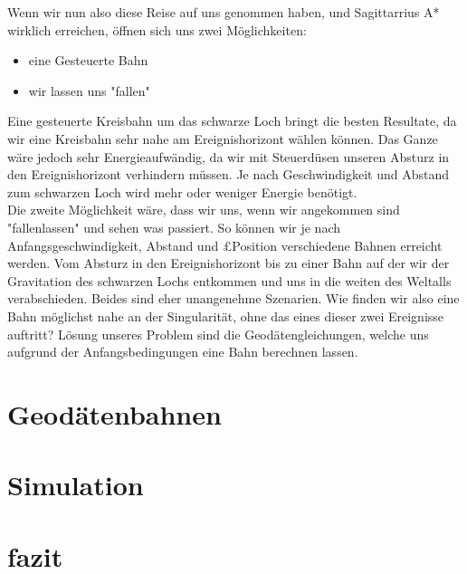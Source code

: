 \begin{refsection}
	Wenn wir nun also diese Reise auf uns genommen haben, und Sagittarrius A* wirklich erreichen, öffnen sich uns zwei Möglichkeiten:
	
	\begin{itemize}
		\item eine Gesteuerte Bahn
		\item wir lassen uns "fallen"
	\end{itemize}

	Eine gesteuerte Kreisbahn um das schwarze Loch bringt die besten Resultate, da wir eine Kreisbahn sehr nahe am Ereignishorizont wählen können. Das Ganze wäre jedoch sehr Energieaufwändig, da wir mit Steuerdüsen unseren Absturz in den Ereignishorizont verhindern müssen. Je nach Geschwindigkeit und Abstand zum schwarzen Loch wird mehr oder weniger Energie benötigt.\\
	Die zweite Möglichkeit wäre, dass wir uns, wenn wir angekommen sind "fallenlassen" und sehen was passiert. So können wir je nach Anfangsgeschwindigkeit, Abstand und £Position verschiedene Bahnen erreicht werden. Vom Absturz in den Ereignishorizont bis zu einer Bahn auf der wir der Gravitation des schwarzen Lochs entkommen und uns in die weiten des Weltalls verabschieden. Beides sind eher unangenehme Szenarien. 
	Wie finden wir also eine Bahn möglichst nahe an der Singularität, ohne das eines dieser zwei Ereignisse auftritt?
	Lösung unseres Problem sind die Geodätengleichungen, welche uns aufgrund der Anfangsbedingungen eine Bahn berechnen lassen.
	
	
	\section{Geodätenbahnen}
	
	
	\section{Simulation}
	
	
	\section{fazit}
	
	
	


	\printbibliography[heading=subbibliography]
	\end{refsection}

